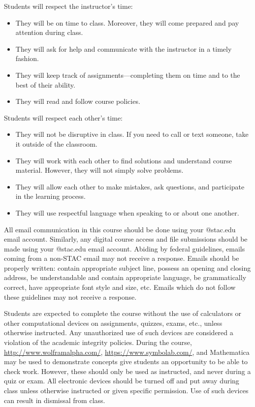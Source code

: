 \documentclass[11pt,letterpaper]{article}
\begin{document}
Students will respect the instructor's time:
	\begin{itemize}
	\item They will be on time to class. Moreover, they will come prepared and pay attention during class. 
	\item They will ask for help and communicate with the instructor in a timely fashion. 
	\item They will keep track of assignments---completing them on time and to the best of their ability.  
	\item They will read and follow course policies. 
	\end{itemize} \pspace

Students will respect each other's time:
	\begin{itemize}
	\item They will not be disruptive in class. If you need to call or text someone, take it outside of the classroom. 
	\item They will work with each other to find solutions and understand course material. However, they will not simply solve problems. 
	\item They will allow each other to make mistakes, ask questions, and participate in the learning process. 
	\item They will use respectful language when speaking to or about one another. 
	\end{itemize}
\sectionbreak



All email communication in this course should be done using your @stac.edu email account. Similarly, any digital course access and file submissions should be made using your @stac.edu email account. Abiding by federal guidelines, emails coming from a non-STAC email may not receive a response. Emails should be properly written: contain appropriate subject line, possess an opening and closing address, be understandable and contain appropriate language, be grammatically correct, have appropriate font style and size, etc. Emails which do not follow these guidelines may not receive a response.
\sectionbreak



Students are expected to complete the course without the use of calculators or other computational devices on assignments, quizzes, exams, etc., unless otherwise instructed. Any unauthorized use of such devices are considered a violation of the academic integrity policies. During the course, \href{http://www.wolframalpha.com/}{http://www.wolframalpha.com/}, \href{https://www.symbolab.com/}{https://www.symbolab.com/}, and Mathematica may be used to demonstrate concepts give students an opportunity to be able to check work. However, these should only be used as instructed, and never during a quiz or exam. All electronic devices should be turned off and put away during class unless otherwise instructed or given specific permission. Use of such devices can result in dismissal from class.
\sectionbreak
\end{document}
